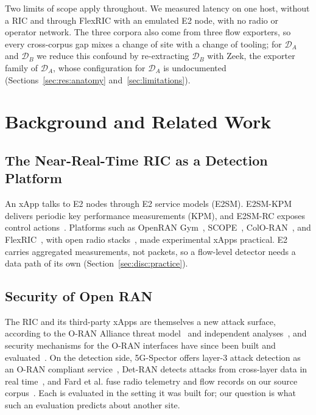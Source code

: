 \documentclass{ieeeaccess}
\newcommand{\DA}{\ensuremath{\mathcal{D}_{A}}}
\newcommand{\DB}{\ensuremath{\mathcal{D}_{B}}}
\begin{document}
Two limits of scope apply throughout. We measured latency on one host, without a RIC and through FlexRIC with an emulated E2 node, with no radio or operator network. The three corpora also come from three flow exporters, so every cross-corpus gap mixes a change of site with a change of tooling; for \DA{} and \DB{} we reduce this confound by re-extracting \DB{} with Zeek, the exporter family of \DA{}, whose configuration for \DA{} is undocumented (Sections~\ref{sec:res:anatomy} and~\ref{sec:limitations}).

\section{Background and Related Work}
\label{sec:related}

\subsection{The Near-Real-Time RIC as a Detection Platform}

An xApp talks to E2 nodes through E2 service models (E2SM). E2SM-KPM delivers periodic key performance measurements (KPM), and E2SM-RC exposes control actions~\cite{polese2023understanding}. Platforms such as OpenRAN Gym~\cite{bonati2023openrangym}, SCOPE~\cite{bonati2021scope}, ColO-RAN~\cite{polese2023coloran}, and FlexRIC~\cite{schmidt2021flexric}, with open radio stacks~\cite{nikaein2014oai,gomez2016srslte}, made experimental xApps practical. E2 carries aggregated measurements, not packets, so a flow-level detector needs a data path of its own (Section~\ref{sec:disc:practice}).

\subsection{Security of Open RAN}

The RIC and its third-party xApps are themselves a new attack surface, according to the O-RAN Alliance threat model~\cite{etsi_wg11_threat} and independent analyses~\cite{liyanage2023openran,mimran2022security}, and security mechanisms for the O-RAN interfaces have since been built and evaluated~\cite{groen2025implementing}. On the detection side, 5G-Spector offers layer-3 attack detection as an O-RAN compliant service~\cite{wen2024spector}, Det-RAN detects attacks from cross-layer data in real time~\cite{scalingi2024detran}, and Fard et al. fuse radio telemetry and flow records on our source corpus~\cite{fard2026crosslayer}. Each is evaluated in the setting it was built for; our question is what such an evaluation predicts about another site.
\end{document}

